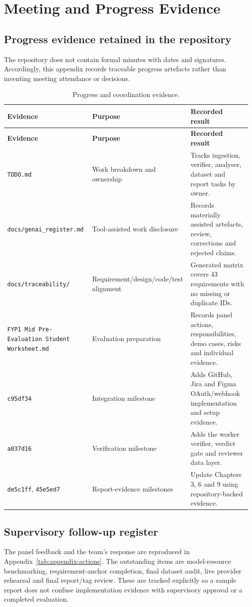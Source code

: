 \chapter{Meeting and Progress Evidence}

\section{Progress evidence retained in the repository}

The repository does not contain formal minutes with dates and signatures.
Accordingly, this appendix records traceable progress artefacts rather than
inventing meeting attendance or decisions.

\begin{longtable}{>{\raggedright\arraybackslash}p{}>{\raggedright\arraybackslash}p{}>{\raggedright\arraybackslash}p{}}
\caption{Progress and coordination evidence.}\label{tab:appendix-meetings}\\
\toprule
\textbf{Evidence} & \textbf{Purpose} & \textbf{Recorded result}\\
\midrule
\endfirsthead
\toprule
\textbf{Evidence} & \textbf{Purpose} & \textbf{Recorded result}\\
\midrule
\endhead
\texttt{TODO.md} & Work breakdown and ownership & Tracks ingestion, verifier, analyser, dataset and report tasks by owner.\\
\texttt{docs/genai\_register.md} & Tool-assisted work disclosure & Records materially assisted artefacts, review, corrections and rejected claims.\\
\texttt{docs/traceability/} & Requirement/\allowbreak design/\allowbreak code/\allowbreak test alignment & Generated matrix covers 43 requirements with no missing or duplicate IDs.\\
\texttt{FYP1 Mid Pre-Evaluation Student Worksheet.md} & Evaluation preparation & Records panel actions, responsibilities, demo cases, risks and individual evidence.\\
\texttt{c95df34} & Integration milestone & Adds GitHub, Jira and Figma OAuth/webhook implementation and setup evidence.\\
\texttt{a037d16} & Verification milestone & Adds the worker verifier, verdict gate and reviewer data layer.\\
\texttt{de5c1ff}, \texttt{45e5ed7} & Report-evidence milestones & Update Chapters 3, 6 and 9 using repository-backed evidence.\\
\bottomrule
\end{longtable}

\section{Supervisory follow-up register}

The panel feedback and the team's response are reproduced in
Appendix~\ref{tab:appendix-actions}. The outstanding items are model-resource
benchmarking, requirement-anchor completion, final dataset audit, live
provider rehearsal and final report/tag review. These are tracked explicitly
so a sample report does not confuse implementation evidence with supervisory
approval or a completed evaluation.
